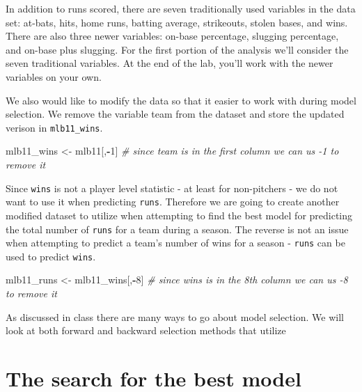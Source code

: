 \documentclass[]{book}
\newenvironment{Shaded}{\begin{snugshade}}{\end{snugshade}}
\newcommand{\CommentTok}[1]{\textcolor[rgb]{0.56,0.35,0.01}{\textit{#1}}}
\newcommand{\DecValTok}[1]{\textcolor[rgb]{0.00,0.00,0.81}{#1}}
\newcommand{\NormalTok}[1]{#1}
\newcommand{\OperatorTok}[1]{\textcolor[rgb]{0.81,0.36,0.00}{\textbf{#1}}}
\newcommand{\StringTok}[1]{\textcolor[rgb]{0.31,0.60,0.02}{#1}}
\theoremstyle{definition}
\theoremstyle{definition}
\theoremstyle{definition}
\theoremstyle{remark}
\begin{document}
In addition to runs scored, there are seven traditionally used variables
in the data set: at-bats, hits, home runs, batting average, strikeouts,
stolen bases, and wins. There are also three newer variables: on-base
percentage, slugging percentage, and on-base plus slugging. For the
first portion of the analysis we'll consider the seven traditional
variables. At the end of the lab, you'll work with the newer variables
on your own.

We also would like to modify the data so that it easier to work with
during model selection. We remove the variable team from the dataset and
store the updated verison in \texttt{mlb11\_wins}.

\begin{Shaded}
\begin{Highlighting}[]
\NormalTok{mlb11_wins <-}\StringTok{ }\NormalTok{mlb11[,}\OperatorTok{-}\DecValTok{1}\NormalTok{] }\CommentTok{# since team is in the first column we can us -1 to remove it}
\end{Highlighting}
\end{Shaded}

Since \texttt{wins} is not a player level statistic - at least for
non-pitchers - we do not want to use it when predicting \texttt{runs}.
Therefore we are going to create another modified dataset to utilize
when attempting to find the best model for predicting the total number
of \texttt{runs} for a team during a season. The reverse is not an issue
when attempting to predict a team's number of wins for a season -
\texttt{runs} can be used to predict \texttt{wins}.

\begin{Shaded}
\begin{Highlighting}[]
\NormalTok{mlb11_runs <-}\StringTok{ }\NormalTok{mlb11_wins[,}\OperatorTok{-}\DecValTok{8}\NormalTok{] }\CommentTok{# since wins is in the 8th column we can us -8 to remove it}
\end{Highlighting}
\end{Shaded}

As discussed in class there are many ways to go about model selection.
We will look at both forward and backward selection methods that utilize

\hypertarget{the-search-for-the-best-model}{%
\section{The search for the best
model}\label{the-search-for-the-best-model}}
\end{document}

